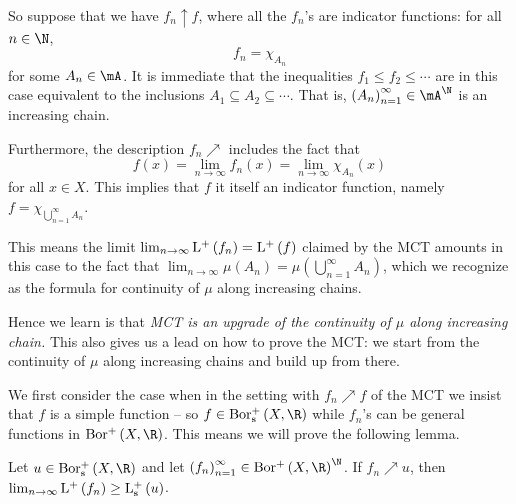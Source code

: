 \documentclass[pmath450]{subfiles}
\begin{document}
    So suppose that we have $f_n\uparrow f$, where all the $f_n$'s are indicator functions: for all $n\in\N$,
    \begin{equation*}
        f_n = \chi_{A_n}
    \end{equation*}
    for some $A_n\in\mA$. It is immediate that the inequalities $f_1\leq f_2\leq\cdots$ are in this case equivalent to the inclusions $A_1\subseteq A_2\subseteq\cdots$. That is, $\left( A_{n} \right)^{\infty}_{n=1}\in\mA^{\N}$ is an increasing chain.

    Furthermore, the description $f_n\nearrow$ includes the fact that
    \begin{equation*}
        f\left( x \right) = \lim_{n\to\infty}f_n\left( x \right)=\lim_{n\to\infty}\chi_{A_n}\left( x \right)
    \end{equation*}
    for all $x\in X$. This implies that $f$ it itself an indicator function, namely $f=\chi_{\bigcup^{\infty}_{n=1}A_n}$.

    This means the limit $\lim_{n\to\infty}\operatorname{L^+}\left( f_n \right)=\operatorname{L^+}\left( f \right)$ claimed by the MCT amounts in this case to the fact that $\lim_{n\to\infty}\mu\left( A_n \right)=\mu\left( \bigcup^{\infty}_{n=1}A_n \right)$, which we recognize as the formula for continuity of $\mu$ along increasing chains.

    Hence we learn is that \textit{MCT is an upgrade of the continuity of $\mu$ along increasing chain.} This also gives us a lead on how to prove the MCT: we start from the continuity of $\mu$ along increasing chains and build up from there.

    We first consider the case when in the setting with $f_n\nearrow f$ of the MCT we insist that $f$ is a simple function -- so $f\in\borpluss\left( X,\R \right)$ while $f_n$'s can be general functions in $\borplus\left( X,\R \right)$. This means we will prove the following lemma.

    \begin{lemma}{}
        Let $u\in\borpluss\left( X,\R \right)$ and let $\left( f_{n} \right)^{\infty}_{n=1}\in\borplus\left( X,\R \right)^{\N}$. If $f_n\nearrow u$, then $\lim_{n\to\infty}\operatorname{L^+}\left( f_n \right)\geq\operatorname{L^+_s}\left( u \right)$.
    \end{lemma}
\end{document}
